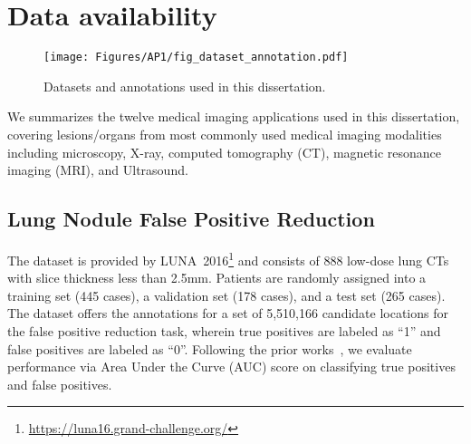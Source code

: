 \chapter{Data availability}
\label{ap1}

\newpage



\begin{sidewaysfigure}
\begin{center}
\texttt{[image: Figures/AP1/fig\_dataset\_annotation.pdf]}
\end{center}
\caption[Datasets and Annotations Used in This Dissertation]{Datasets and annotations used in this dissertation.}
\label{ap1:fig:dataset_annotation}
\end{sidewaysfigure}



We summarizes the twelve medical imaging applications used in this dissertation, covering lesions/organs from most commonly used medical imaging modalities including microscopy, X-ray, computed tomography (CT), magnetic resonance imaging (MRI), and Ultrasound.

\section*{Lung Nodule False Positive Reduction}
\label{ap1:lung_nodule_classification}

The dataset is provided by LUNA~2016\footnote{\href{https://luna16.grand-challenge.org/}{https://luna16.grand-challenge.org/}}\citep{setio2017validation} and consists of 888 low-dose lung CTs with slice thickness less than 2.5mm. Patients are randomly assigned into a training set (445 cases), a validation set (178 cases), and a test set (265 cases). The dataset offers the annotations for a set of 5,510,166 candidate locations for the false positive reduction task, wherein true positives are labeled as ``1'' and false positives are labeled as ``0''. Following the prior works~\citep{setio2016pulmonary,sun2017automatic}, we evaluate performance via Area Under the Curve (AUC) score on classifying true positives and false positives.

